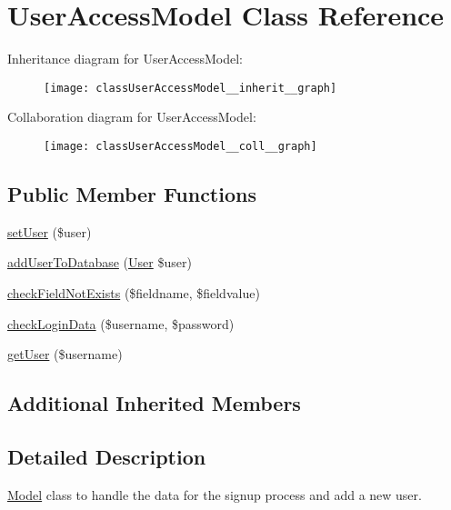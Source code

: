 \hypertarget{classUserAccessModel}{\section{User\+Access\+Model Class Reference}
\label{classUserAccessModel}
}


Inheritance diagram for User\+Access\+Model\+:\nopagebreak
\begin{figure}[H]
\begin{center}
\leavevmode
\texttt{[image: classUserAccessModel\_\_inherit\_\_graph]}
\end{center}
\end{figure}


Collaboration diagram for User\+Access\+Model\+:\nopagebreak
\begin{figure}[H]
\begin{center}
\leavevmode
\texttt{[image: classUserAccessModel\_\_coll\_\_graph]}
\end{center}
\end{figure}
\subsection*{Public Member Functions}
\begin{DoxyCompactItemize}
\item 
\hyperlink{classUserAccessModel_a65363d66e0dcf1cdf7caea08de553e1e}{set\+User} (\$user)
\item 
\hyperlink{classUserAccessModel_a8b000dcb063400f3068ff83a4a467021}{add\+User\+To\+Database} (\hyperlink{classUser}{User} \$user)
\item 
\hyperlink{classUserAccessModel_a7ed6ab03bbd86466f0864996390254af}{check\+Field\+Not\+Exists} (\$fieldname, \$fieldvalue)
\item 
\hyperlink{classUserAccessModel_a4120f778b0415dec524876f84e6c87af}{check\+Login\+Data} (\$username, \$password)
\item 
\hyperlink{classUserAccessModel_a81acfe08b082369c72f78c5e8327ea72}{get\+User} (\$username)
\end{DoxyCompactItemize}
\subsection*{Additional Inherited Members}


\subsection{Detailed Description}
\hyperlink{classModel}{Model} class to handle the data for the signup process and add a new user.

